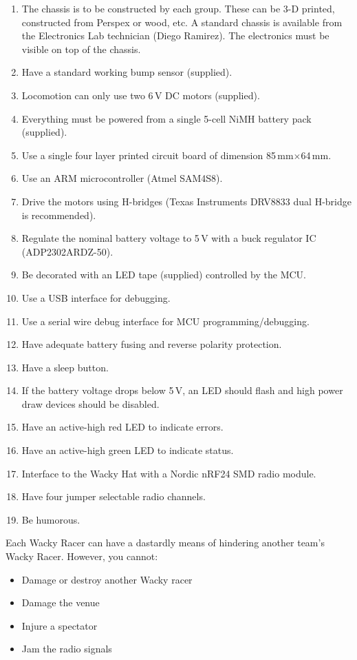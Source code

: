 \documentclass[11pt, a4paper]{article}
\begin{document}
\begin{enumerate}
\item The chassis is to be constructed by each group.  These can be 3-D printed,
  constructed from Perspex or wood, etc.  A standard chassis is available from
  the Electronics Lab technician (Diego Ramirez).  The electronics must be
  visible on top of the chassis.
\item Have a standard working bump sensor (supplied).
\item Locomotion can only use two 6\,V DC motors (supplied).
\item Everything must be powered from a single 5-cell NiMH battery pack (supplied).
\item Use a single four layer printed circuit board of dimension 85\,mm$\times$64\,mm.
\item Use an ARM microcontroller (Atmel SAM4S8).
\item Drive the motors using H-bridges (Texas Instruments DRV8833 dual
  H-bridge is recommended).
\item Regulate the nominal battery voltage to 5\,V with a buck
  regulator IC (ADP2302ARDZ-50).
\item Be decorated with an LED tape (supplied) controlled by the MCU.
\item Use a USB interface for debugging.
\item Use a serial wire debug interface for MCU programming/debugging.
\item Have adequate battery fusing and reverse polarity protection.
\item Have a sleep button.
\item If the battery voltage drops below 5\,V, an LED should flash and high power draw devices should be disabled.
\item Have an active-high red LED to indicate errors.
\item Have an active-high green LED to indicate status.
\item Interface to the Wacky Hat with a Nordic nRF24 SMD radio module.
\item Have four jumper selectable radio channels.
\item Be humorous.
\end{enumerate}


Each Wacky Racer can have a dastardly means of hindering another
team's Wacky Racer.  However, you cannot:
%
\begin{itemize}
\item Damage or destroy another Wacky racer
\item Damage the venue
\item Injure a spectator
\item Jam the radio signals
\end{itemize}
\end{document}
